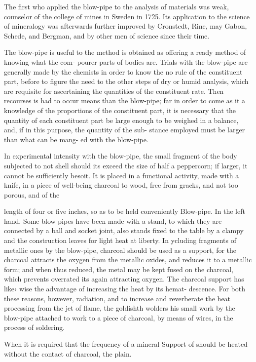 \documentclass{article}
\begin{document}
The first who applied the blow-pipe to the analysis of materials was weak, counselor of the college of mines in Sweden in 1725. Its application to the science of mineralogy was afterwards further improved by Cronstedt, Rine, may Gabon, Schede, and Bergman, and by other men of science since their time.

The blow-pipe is useful to the method is obtained as offering a ready method of knowing what the com- pourer parts of bodies are. Trials with the blow-pipe are generally made by the chemists in order to know the no rule of the constituent part, before to figure the need to the other steps of dry or humid analysis, which are requisite for ascertaining the quantities of the constituent rate. Then recourses is had to occur means than the blow-pipe; far in order to come as it a knowledge of the proportions of the constituent part, it is necessary that the quantity of each constituent part be large enough to be weighed in a balance, and, if in this purpose, the quantity of the sub- stance employed must be larger than what can be mang- ed with the blow-pipe.

In experimental intensity with the blow-pipe, the small fragment of the body subjected to not shell should its exceed the size of half a peppercorn; if larger, it cannot be sufficiently besoit. It is placed in a functional activity, made with a knife, in a piece of well-being charcoal to wood, free from gracks, and not too porous, and of the

length of four or five inches, so as to be held conveniently Blow-pipe. In the left hand. Some blow-pipes have been made with a stand, to which they are connected by a ball and socket joint, also stands fixed to the table by a clampy and the construction leaves for light heat at liberty. In ycluding fragments of metallic ones by the blow-pipe, charcoal should be used as a support, for the charcoal attracts the oxygen from the metallic oxides, and reduces it to a metallic form; and when thus reduced, the metal may be kept fused on the charcoal, which prevents overrated its again attracting oxygen. The charcoal support has like› wise the advantage of increasing the heat by its hemat- descence. For both these reasons, however, radiation, and to increase and reverberate the heat processing from the jet of flame, the goldishth wolders his small work by the blow-pipe attached to work to a piece of charcoal, by means of wires, in the process of soldering.

When it is required that the frequency of a mineral Support of should be heated without the contact of charcoal, the plain.
\end{document}
